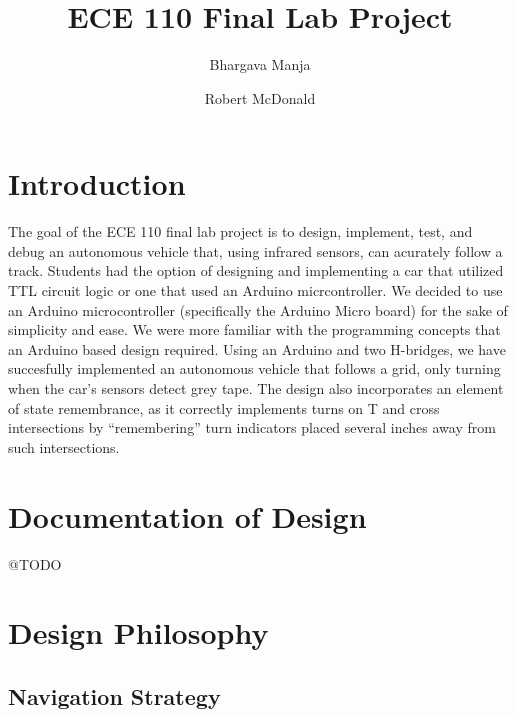 \documentclass[12pt]{report}
\title{ECE 110 Final Lab Project}
\author{
  Bhargava Manja
  \and
  Robert McDonald
}
\begin{document}
\maketitle

\section*{Introduction}
The goal of the ECE 110 final lab project is to design, implement, test, and
debug an autonomous vehicle that, using infrared sensors, can acurately follow
a track. Students had the option of designing and implementing a car that
utilized TTL circuit logic or one that used an Arduino micrcontroller. We decided to use an Arduino microcontroller (specifically the Arduino Micro board) for
the sake of simplicity and ease. We were more familiar with the programming
concepts that an Arduino based design required. Using an Arduino and two H-bridges, we have succesfully implemented an autonomous vehicle that follows a grid,
only turning when the car's sensors detect grey tape. The design also incorporates an element of state remembrance, as it correctly implements turns on T and cross intersections by ``remembering'' turn indicators placed several inches away
from such intersections.

\section*{Documentation of Design}
@TODO
\section*{Design Philosophy}
\subsection*{Navigation Strategy}
\end{document}
